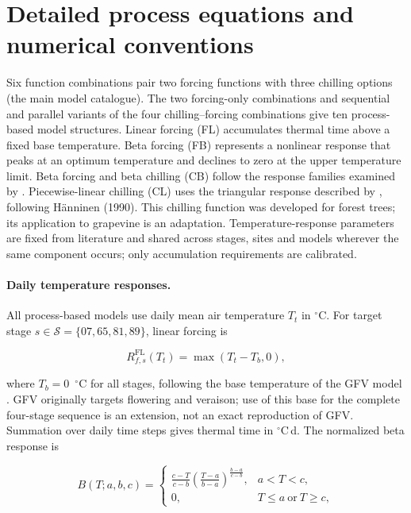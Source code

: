 \documentclass[a4paper,11pt]{article}
\let\OriginalSection\section
\renewcommand{\section}{\FloatBarrier\OriginalSection}
\begin{document}
\section{Detailed process equations and numerical conventions}

Six function combinations pair two forcing functions with three chilling options (the main model catalogue). The two forcing-only combinations and sequential and parallel variants of the four chilling--forcing combinations give ten process-based model structures. Linear forcing (FL) accumulates thermal time above a fixed base temperature. Beta forcing (FB) represents a nonlinear response that peaks at an optimum temperature and declines to zero at the upper temperature limit. Beta forcing and beta chilling (CB) follow the response families examined by \citet{filaComparisonDifferentModelling2014}. Piecewise-linear chilling (CL) uses the triangular response described by \citet{deWergifosseHETEROFOR2020}, following H\"anninen (1990). This chilling function was developed for forest trees; its application to grapevine is an adaptation. Temperature-response parameters are fixed from literature and shared across stages, sites and models wherever the same component occurs; only accumulation requirements are calibrated.

\paragraph{Daily temperature responses.}
All process-based models use daily mean air temperature $T_t$ in $^{\circ}$C. For target stage $s\in\mathcal{S}=\{07,65,81,89\}$, linear forcing is

\begin{equation}
R^{\mathrm{FL}}_{f,s}(T_t)=\max(T_t-T_b,0),
\label{eq:linear_forcing}
\end{equation}

where $T_b=0$~$^{\circ}$C for all stages, following the base temperature of the GFV model \citep{parkerGeneralPhenologicalModel2011a}. GFV originally targets flowering and veraison; use of this base for the complete four-stage sequence is an extension, not an exact reproduction of GFV. Summation over daily time steps gives thermal time in $^{\circ}$C\,d. The normalized beta response is

\begin{equation}
B(T;a,b,c)=
\begin{cases}
\displaystyle\frac{c-T}{c-b}
\left(\frac{T-a}{b-a}\right)^{\!\frac{b-a}{c-b}}, & a<T<c,\\[6pt]
0, & T\leq a\ \text{or}\ T\geq c,
\end{cases}
\label{eq:beta_response}
\end{equation}
\end{document}
